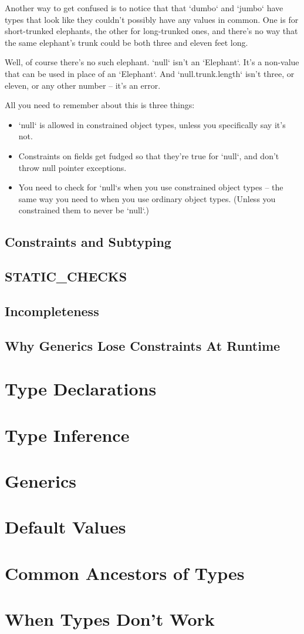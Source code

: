 Another way to get confused is to notice that that \xcd`dumbo` and \xcd`jumbo`
have types that look like they couldn't possibly have any values in common.
One is for short-trunked elephants, the other for long-trunked ones, and
there's no way that the same elephant's trunk could be both three and eleven
feet long.  

Well, of course there's no such elephant.  \xcd`null` isn't an \xcd`Elephant`.
It's a non-value that can be used in place of an \xcd`Elephant`.  And
\xcd`null.trunk.length` isn't three, or eleven, or any other number -- it's an
error.

All you need to remember about this is three things: 
\begin{itemize}
\item \xcd`null` is allowed in constrained object types, unless you
      specifically say it's not.
\item Constraints on fields get fudged so that they're true for \xcd`null`,
      and don't throw null pointer exceptions.
\item You need to check for \xcd`null`s when you use constrained object types --
      the same way you need to when you use ordinary object types.  (Unless
      you constrained them to never be \xcd`null`.)
\end{itemize}




\subsection{Constraints and Subtyping}
\subsection{STATIC\_CHECKS}
\subsection{Incompleteness}
\subsection{Why Generics Lose Constraints At Runtime}

\section{Type Declarations}
\label{sect:TypeDecl}
\section{Type Inference}
\section{Generics}
\section{Default Values}
\section{Common Ancestors of Types}
\section{When Types Don't Work}

